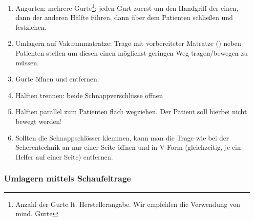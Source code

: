 \begin{ProcedureStepsNoHeading}
{\begin{enumerate}
\begin{enumerate}
    Diese Methode ist besonders bei Becken- und
    Oberschenkelverletzungen sinnvoll und der zweiten
    Methode vorzuziehen da der Patient nicht am Becken
    bewegt wird.
    \item 2. Methode: beide Teile getrennt, Patient leicht an
    Schulter und Hüfte zur Seite gedreht und jeweiligen Tragenteil
    darunter geschoben. Hälften zuerst am Kopf-, dann am Fußende
    schließen. Kontrolle des sicheren Schlusses!
    \end{enumerate}
    \item Angurten: mehrere Gurte\footnote{Anzahl der Gurte lt.
    Herstellerangabe. Wir empfehlen die Verwendung von mind.  Gurte};
    jeden Gurt zuerst um den Handgriff der einen, dann der anderen Hälfte
    führen,  dann über dem Patienten schließen und festziehen.
    \item Umlagern auf Vakuummatratze: Trage mit
    vorbereiteter Matratze
    () neben
    Patienten stellen um diesen
    einen möglichst geringen Weg tragen/bewegen zu müssen.
    \item Gurte öffnen und entfernen.
    \item Hälften trennen: beide Schnappverschlüsse öffnen
    \item Hälften parallel zum Patienten flach wegziehen. Der Patient soll
    hierbei nicht bewegt werden!
    \item Sollten die Schnappschlösser klemmen, kann man die
    Trage wie bei der Scherentechnik an nur einer Seite
    öffnen und in V-Form (gleichzeitig, je ein Helfer auf
    einer Seite) entfernen.
\end{enumerate}
}{}{}{}{}
\end{ProcedureStepsNoHeading}

\clearpage
\subsubsection{Umlagern mittels Schaufeltrage}
\label{topic:schaufeltrage-umlagern}

